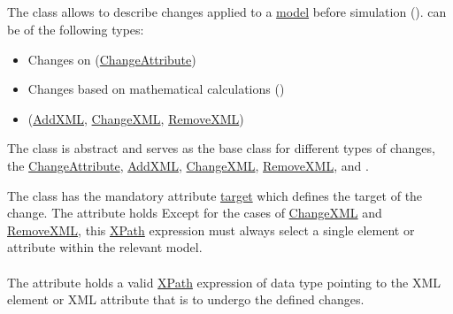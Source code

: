 \subsection{}
\label{class:change}
The  class allows to describe changes applied to a \hyperref[class:model]{model} before simulation ().  can be of the following types:
\begin{itemize}
	\item{Changes on  (\hyperref[class:changeAttribute]{ChangeAttribute})}	
	\item{Changes based on mathematical calculations (\ComputeChange)} 
	\item{ (\hyperref[class:addXml]{AddXML}, \hyperref[class:changeXml]{ChangeXML}, \hyperref[class:removeXml]{RemoveXML})}
\end{itemize}

The  class is abstract and serves as the base class for different types of changes, the \hyperref[class:changeAttribute]{ChangeAttribute}, \hyperref[class:addXml]{AddXML}, \hyperref[class:changeXml]{ChangeXML}, \hyperref[class:removeXml]{RemoveXML}, and \ComputeChange.

The  class has the mandatory attribute \hyperref[sec:changeTarget]{target} which defines the target of the change. The \hyperref[sec:changeTarget]{} attribute holds  Except for the cases of \hyperref[class:changeXml]{ChangeXML} and \hyperref[class:removeXml]{RemoveXML}, this \hyperref[sec:xpath]{XPath} expression must always select a single element or attribute within the relevant model.



\paragraph*{}
\label{sec:changeTarget}
The  attribute holds  a valid \hyperref[sec:xpath]{XPath} expression of data type \hyperref[type:xpath]{} pointing to the XML element or XML attribute that is to undergo the defined changes.


